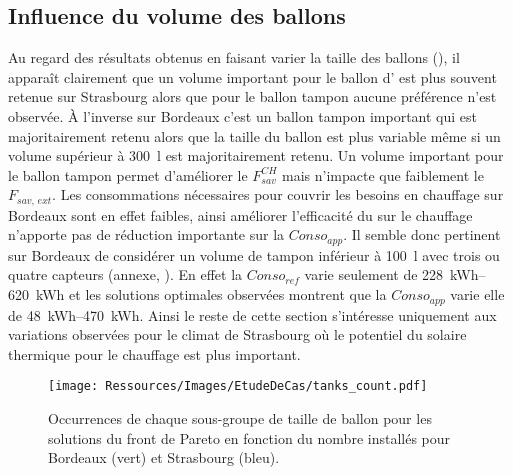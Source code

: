\subsection{Influence du volume des ballons} %
\label{sub:influence_du_volume_des_ballons}
Au regard des résultats obtenus en faisant varier la taille des ballons
(), il apparaît clairement que un volume important
pour le ballon d’ est plus souvent retenue sur Strasbourg alors que pour le
ballon tampon aucune préférence n’est observée. À l’inverse sur Bordeaux c’est un ballon
tampon important qui est majoritairement retenu alors que la taille du ballon 
est plus variable même si un volume supérieur à \SI{300}{\litre} est majoritairement
retenu. Un volume important pour le ballon tampon permet d’améliorer le $F_{sav}^{CH}$
mais n’impacte que faiblement le $F_{sav,\, ext}$. Les consommations nécessaires pour
couvrir les besoins en chauffage sur Bordeaux sont en effet faibles, ainsi améliorer
l’efficacité du  sur le chauffage n’apporte pas de réduction importante sur la
$Conso_{app}$. Il semble donc pertinent sur Bordeaux de considérer un volume de tampon
inférieur à \SI{100}{\litre} avec trois ou quatre capteurs (annexe, ).
En effet la $Conso_{ref}$ varie seulement de \SIrange{228}{620}{kWh} et les solutions
optimales observées montrent que la $Conso_{app}$ varie elle de \SIrange{48}{470}{kWh}. Ainsi le
reste de cette section s’intéresse uniquement aux variations observées pour le climat de
Strasbourg où le potentiel du solaire thermique pour le chauffage est plus important.

\begin{figure}
    \centering
    \texttt{[image: Ressources/Images/EtudeDeCas/tanks\_count.pdf]}
    \caption[Occurrences de chaque sous-groupe de taille de ballon pour les solutions du front de Pareto]
             {Occurrences de chaque sous-groupe de taille de ballon pour les solutions du front de Pareto
              en fonction du nombre installés pour Bordeaux (vert) et Strasbourg (bleu).}
    \label{fig:occurence_taille_ballons}
\end{figure}

